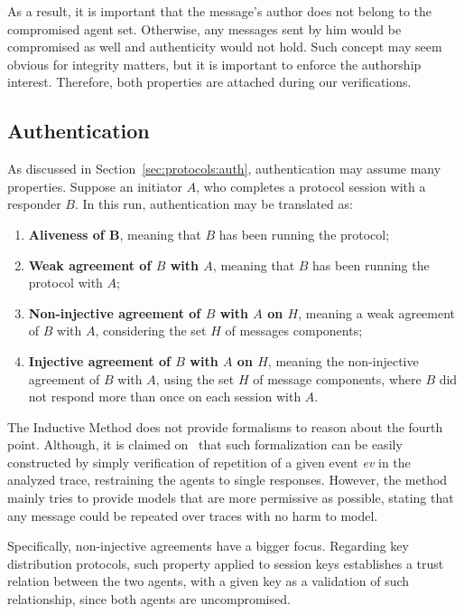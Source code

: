 As a result, it is important that the message's author does not belong to the compromised agent set. Otherwise, any messages sent by him would be compromised as well and authenticity would not hold. Such concept may seem obvious for integrity matters, but it is important to enforce the authorship interest. Therefore, both properties are attached during our verifications.



\subsection{Authentication}
As discussed in Section~\ref{sec:protocols:auth}, authentication may assume many properties. Suppose an initiator \(A\), who completes a protocol session with a responder \(B\). In this run, authentication may be translated as:

\begin{enumerate}
  \item \textbf{Aliveness of B}, meaning that \(B\) has been running the protocol;
  \item \textbf{Weak agreement of \(B\) with \(A\)}, meaning that \(B\) has been running the protocol with \(A\);
  \item \textbf{Non-injective agreement of \(B\) with \(A\) on \(H\)}, meaning a weak agreement of \(B\) with \(A\), considering the set \(H\) of messages components;
  \item \textbf{Injective agreement of \(B\) with \(A\) on \(H\)}, meaning the non-injective agreement of \(B\) with \(A\), using the set \(H\) of message components, where \(B\) did not respond more than once on each session with \(A\).
\end{enumerate}

The Inductive Method does not provide formalisms to reason about the fourth point. Although, it is claimed on~\cite{Bella2007} that such formalization can be easily constructed by simply verification of repetition of a given event \textit{ev} in the analyzed trace, restraining the agents to single responses. However, the method mainly tries to provide models that are more permissive as possible, stating that any message could be repeated over traces with no harm to model.

Specifically, non-injective agreements have a bigger focus. Regarding key distribution protocols, such property applied to session keys establishes a trust relation between the two agents, with a given key as a validation of such relationship, since both agents are uncompromised.

